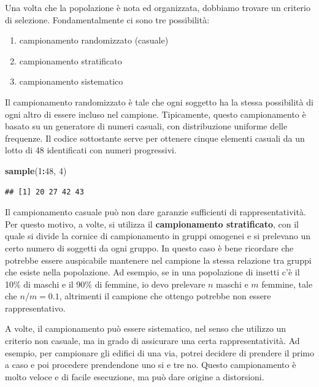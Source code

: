 \documentclass[a4paper,12pt,oneside]{book}
\providecommand{\tightlist}{%
  \setlength{\itemsep}{0pt}\setlength{\parskip}{0pt}}
\newenvironment{Shaded}{\begin{snugshade}}{\end{snugshade}}
\newcommand{\KeywordTok}[1]{\textcolor[rgb]{0.13,0.29,0.53}{\textbf{#1}}}
\newcommand{\DecValTok}[1]{\textcolor[rgb]{0.00,0.00,0.81}{#1}}
\newcommand{\OperatorTok}[1]{\textcolor[rgb]{0.81,0.36,0.00}{\textbf{#1}}}
\newcommand{\NormalTok}[1]{#1}
\begin{document}
Una volta che la popolazione è nota ed organizzata, dobbiamo trovare un
criterio di selezione. Fondamentalmente ci sono tre possibilità:

\begin{enumerate}
\def\labelenumi{\arabic{enumi}.}
\tightlist
\item
  campionamento randomizzato (casuale)
\item
  campionamento stratificato
\item
  campionamento sistematico
\end{enumerate}

Il campionamento randomizzato è tale che ogni soggetto ha la stessa
possibilità di ogni altro di essere incluso nel campione. Tipicamente,
questo campionamento è basato su un generatore di numeri casuali, con
distribuzione uniforme delle frequenze. Il codice sottostante serve per
ottenere cinque elementi casuali da un lotto di 48 identificati con
numeri progressivi.

\begin{Shaded}
\begin{Highlighting}[]
\KeywordTok{sample}\NormalTok{(}\DecValTok{1}\OperatorTok{:}\DecValTok{48}\NormalTok{, }\DecValTok{4}\NormalTok{)}
\end{Highlighting}
\end{Shaded}

\begin{verbatim}
## [1] 20 27 42 43
\end{verbatim}

Il campionamento casuale può non dare garanzie sufficienti di
rappresentatività. Per questo motivo, a volte, si utilizza il
\textbf{campionamento stratificato}, con il quale si divide la cornice
di campionamento in gruppi omogenei e si prelevano un certo numero di
soggetti da ogni gruppo. In questo caso è bene ricordare che potrebbe
essere auspicabile mantenere nel campione la stessa relazione tra gruppi
che esiste nella popolazione. Ad esempio, se in una popolazione di
insetti c'è il 10\% di maschi e il 90\% di femmine, io devo prelevare
\(n\) maschi e \(m\) femmine, tale che \(n/m = 0.1\), altrimenti il
campione che ottengo potrebbe non essere rappresentativo.

A volte, il campionamento può essere sistematico, nel senso che utilizzo
un criterio non casuale, ma in grado di assicurare una certa
rappresentatività. Ad esempio, per campionare gli edifici di una via,
potrei decidere di prendere il primo a caso e poi procedere prendendone
uno si e tre no. Questo campionamento è molto veloce e di facile
esecuzione, ma può dare origine a distorsioni.
\end{document}
